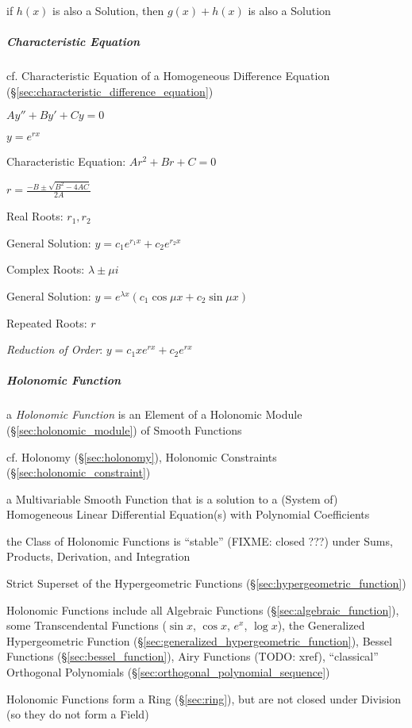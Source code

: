 if $h(x)$ is also a Solution, then $g(x) + h(x)$ is also a Solution



\subparagraph{Characteristic Equation}\label{sec:characteristic_equation}\hfill

cf. Characteristic Equation of a Homogeneous Difference Equation
(\S\ref{sec:characteristic_difference_equation})

$A y'' + B y' + C y = 0$

$y = e^{rx}$

Characteristic Equation: $Ar^2 + Br + C = 0$

$r = \frac{-B \pm \sqrt{B^2 - 4AC}}{2A}$

Real Roots: $r_1, r_2$

General Solution: $y = c_1e^{r_1x} + c_2e^{r_2x}$

Complex Roots: $\lambda \pm \mu i$

General Solution: $y = e^{\lambda x}(c_1 \cos\mu{x} + c_2 \sin\mu{x})$

Repeated Roots: $r$

\emph{Reduction of Order}: $y = c_1 x e^{rx} + c_2 e^{rx}$



\subparagraph{Holonomic Function}\label{sec:holonomic_function}\hfill

a \emph{Holonomic Function} is an Element of a Holonomic Module
(\S\ref{sec:holonomic_module}) of Smooth Functions

\fist cf. Holonomy (\S\ref{sec:holonomy}), Holonomic Constraints
(\S\ref{sec:holonomic_constraint})

a Multivariable Smooth Function that is a solution to a (System of) Homogeneous
Linear Differential Equation(s) with Polynomial Coefficients

the Class of Holonomic Functions is ``stable'' (FIXME: closed ???) under Sums,
Products, Derivation, and Integration

Strict Superset of the Hypergeometric Functions
(\S\ref{sec:hypergeometric_function})

Holonomic Functions include all Algebraic Functions
(\S\ref{sec:algebraic_function}), some Transcendental Functions ($\sin x$,
$\cos x$, $e^x$, $\log x$), the Generalized Hypergeometric Function
(\S\ref{sec:generalized_hypergeometric_function}), Bessel Functions
(\S\ref{sec:bessel_function}), Airy Functions (TODO: xref), ``classical''
Orthogonal Polynomials (\S\ref{sec:orthogonal_polynomial_sequence})

Holonomic Functions form a Ring (\S\ref{sec:ring}), but are not closed under
Division (so they do not form a Field)




